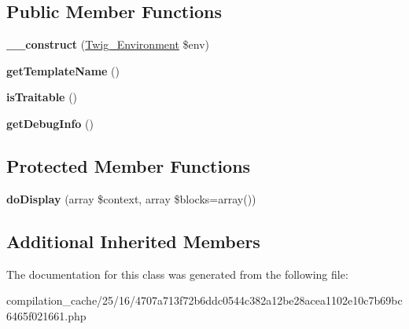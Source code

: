 \subsection*{Public Member Functions}
\begin{DoxyCompactItemize}
\item 
\hypertarget{class_____twig_template__25164707a713f72b6ddc0544c382a12be28acea1102e10c7b69bc6465f021661_a4f8326243132c1450a81e0a817aa1be7}{}{\bfseries \+\_\+\+\_\+construct} (\hyperlink{class_twig___environment}{Twig\+\_\+\+Environment} \$env)\label{class_____twig_template__25164707a713f72b6ddc0544c382a12be28acea1102e10c7b69bc6465f021661_a4f8326243132c1450a81e0a817aa1be7}

\item 
\hypertarget{class_____twig_template__25164707a713f72b6ddc0544c382a12be28acea1102e10c7b69bc6465f021661_a621a3ccd148ed8b9e937da6959c98f39}{}{\bfseries get\+Template\+Name} ()\label{class_____twig_template__25164707a713f72b6ddc0544c382a12be28acea1102e10c7b69bc6465f021661_a621a3ccd148ed8b9e937da6959c98f39}

\item 
\hypertarget{class_____twig_template__25164707a713f72b6ddc0544c382a12be28acea1102e10c7b69bc6465f021661_aa9eb89be270f6afc256ef5e272b78a63}{}{\bfseries is\+Traitable} ()\label{class_____twig_template__25164707a713f72b6ddc0544c382a12be28acea1102e10c7b69bc6465f021661_aa9eb89be270f6afc256ef5e272b78a63}

\item 
\hypertarget{class_____twig_template__25164707a713f72b6ddc0544c382a12be28acea1102e10c7b69bc6465f021661_abd0ecb0136f4228db2bd963bfc1e20d7}{}{\bfseries get\+Debug\+Info} ()\label{class_____twig_template__25164707a713f72b6ddc0544c382a12be28acea1102e10c7b69bc6465f021661_abd0ecb0136f4228db2bd963bfc1e20d7}

\end{DoxyCompactItemize}
\subsection*{Protected Member Functions}
\begin{DoxyCompactItemize}
\item 
\hypertarget{class_____twig_template__25164707a713f72b6ddc0544c382a12be28acea1102e10c7b69bc6465f021661_adb62b7c226e07d30f836ed16158d924f}{}{\bfseries do\+Display} (array \$context, array \$blocks=array())\label{class_____twig_template__25164707a713f72b6ddc0544c382a12be28acea1102e10c7b69bc6465f021661_adb62b7c226e07d30f836ed16158d924f}

\end{DoxyCompactItemize}
\subsection*{Additional Inherited Members}


The documentation for this class was generated from the following file\+:\begin{DoxyCompactItemize}
\item 
compilation\+\_\+cache/25/16/4707a713f72b6ddc0544c382a12be28acea1102e10c7b69bc6465f021661.\+php\end{DoxyCompactItemize}

